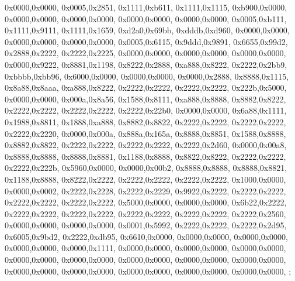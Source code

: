 {	0x0000,0x0000,
	0x0005,0x2851,
	0x1111,0xb611,
	0x1111,0x1115,
	0xb900,0x0000,
	0x0000,0x0000,
	0x0000,0x0000,
	0x0000,0x0000,
	0x0000,0x0000,
	0x0005,0xb111,
	0x1111,0x9111,
	0x1111,0x1659,
	0xd2a0,0x69bb,
	0xdddb,0xd960,
	0x0000,0x0000,
	0x0000,0x0000,
	0x0000,0x0000,
	0x0005,0x6115,
	0x9ddd,0x9891,
	0x6655,0x99d2,
	0x2888,0x2222,
	0x2222,0x2225,
	0x0000,0x0000,
	0x0000,0x0000,
	0x0000,0x0000,
	0x0000,0x9222,
	0x8881,0x1198,
	0x8222,0x2888,
	0xa888,0x8222,
	0x2222,0x2bb9,
	0xbbbb,0xbb96,
	0x6000,0x0000,
	0x0000,0x0000,
	0x0000,0x2888,
	0x8888,0x1115,
	0x8a88,0x8aaa,
	0xa888,0x8222,
	0x2222,0x2222,
	0x2222,0x2222,
	0x222b,0x5000,
	0x0000,0x0000,
	0x000a,0x8a56,
	0x1588,0x8111,
	0xa888,0x8888,
	0x8882,0x8222,
	0x2222,0x2222,
	0x2222,0x2222,
	0x2222,0x22b0,
	0x0000,0x0000,
	0x6a88,0x1111,
	0x1988,0x8811,
	0x1888,0xa888,
	0x8882,0x8822,
	0x2222,0x2222,
	0x2222,0x2222,
	0x2222,0x2220,
	0x0000,0x000a,
	0x888a,0x165a,
	0x8888,0x8851,
	0x1588,0x8888,
	0x8882,0x8822,
	0x2222,0x2222,
	0x2222,0x2222,
	0x2222,0x2d60,
	0x0000,0x00a8,
	0x8888,0x8888,
	0x8888,0x8881,
	0x1188,0x8888,
	0x8822,0x8222,
	0x2222,0x2222,
	0x2222,0x222b,
	0x5960,0x0000,
	0x0000,0x00b2,
	0x8888,0x8888,
	0x8888,0x8821,
	0x1188,0x8888,
	0x8222,0x2222,
	0x2222,0x2222,
	0x2222,0x2222,
	0x1000,0x0000,
	0x0000,0x0002,
	0x2222,0x2228,
	0x2222,0x2229,
	0x9922,0x2222,
	0x2222,0x2222,
	0x2222,0x2222,
	0x2222,0x2222,
	0x5000,0x0000,
	0x0000,0x0000,
	0x6b22,0x2222,
	0x2222,0x2222,
	0x2222,0x2222,
	0x2222,0x2222,
	0x2222,0x2222,
	0x2222,0x2560,
	0x0000,0x0000,
	0x0000,0x0000,
	0x0001,0x5992,
	0x2222,0x2222,
	0x2222,0x2d95,
	0x6005,0x9bd2,
	0x2222,0xdb95,
	0x6610,0x0000,
	0x0000,0x0000,
	0x0000,0x0000,
	0x0000,0x0000,
	0x0000,0x1111,
	0x0000,0x0000,
	0x0000,0x0000,
	0x0000,0x0000,
	0x0000,0x0000,
	0x0000,0x0000,
	0x0000,0x0000,
	0x0000,0x0000,
	0x0000,0x0000,
	0x0000,0x0000,
	0x0000,0x0000,
	0x0000,0x0000,
	0x0000,0x0000,
	0x0000,0x0000,
};
